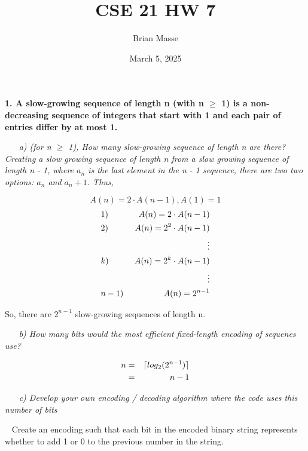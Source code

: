 \documentclass[12pt, letterpaper]{article}
\title{CSE 21 HW 7}
\author{Brian Masse}
\date{March 5, 2025}
\DeclarePairedDelimiter{\ceil}{\lceil}{\rceil}
\begin{document}
\maketitle
\newpage


\bf{ 1. A slow-growing sequence of length n (with n \(\ge\) 1) is a non-decreasing sequence of integers that start with 1 and each pair of entries differ by at most 1. }

\-\ \newline
\-\ \it{ a) (for n \(\ge\) 1), How many slow-growing sequence of length n are there? }
\-\ \newline
\-\ \newline
\textnormal{ Creating a slow growing sequence of length n from a slow growing sequence of length n - 1, where \(a_n\) is the last element in the n - 1 sequence, there are two two options: \(a_n\) and \(a_n + 1\). Thus,}

\[A(n) = 2 \cdot A(n - 1), A(1) = 1\]
\begin{eqnarray*}
&1)& \textnormal{ } A(n) = 2 \cdot A(n - 1) \\
&2)& \textnormal{ } A(n) = 2^2 \cdot A(n - 1) \\
&\textnormal{  }& \vdots \\
&k)& \textnormal{ } A(n) = 2^k \cdot A(n - 1) \\
&\textnormal{  }& \vdots \\
&n - 1)& \textnormal{ } A(n) = 2^{n - 1} \\
\end{eqnarray*}

\textnormal{ So, there are \(2^{n- 1}\) slow-growing sequences of length n. }

\-\ \newline
\-\ \it{ b) How many bits would the most efficient fixed-length encoding of sequenes use? }


\begin{eqnarray*}
n &=& \ceil{ log_2( 2^{n - 1}) } \\
&=& n - 1
\end{eqnarray*}



\-\ \newline
\-\ \it{ c) Develop your own encoding / decoding algorithm where the code uses this number of bits }

\-\ \newline
\textnormal{ Create an encoding such that each bit in the encoded binary string represents whether to add 1 or 0 to the previous number in the string. }
\end{document}
